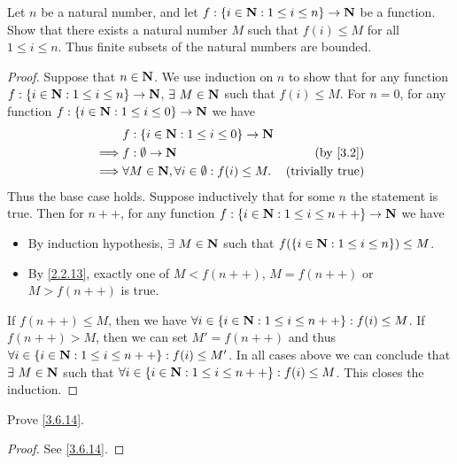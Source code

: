 \begin{exercise}\label{ex 3.6.3}
  Let \(n\) be a natural number, and let \(f : \{i \in \mathbf{N} : 1 \leq i \leq n\} \to \mathbf{N}\) be a function.
  Show that there exists a natural number \(M\) such that \(f(i) \leq M\) for all \(1 \leq i \leq n\).
  Thus finite subsets of the natural numbers are bounded.
\end{exercise}

\begin{proof}
  Suppose that \(n \in \mathbf{N}\).
  We use induction on \(n\) to show that for any function \(f : \{i \in \mathbf{N} : 1 \leq i \leq n\} \to \mathbf{N}\), \(\exists\ M \in \N\) such that \(f(i) \leq M\).
  For \(n = 0\), for any function \(f : \{i \in \mathbf{N} : 1 \leq i \leq 0\} \to \mathbf{N}\) we have
  \begin{align*}
             & f : \{i \in \N : 1 \leq i \leq 0\} \to \N                                          \\
    \implies & f : \emptyset \to \N                                     & \text{(by \cref{3.2})}  \\
    \implies & \forall M \in \N, \forall i \in \emptyset : f(i) \leq M. & \text{(trivially true)} \\
  \end{align*}
  Thus the base case holds.
  Suppose inductively that for some \(n\) the statement is true.
  Then for \(n++\), for any function \(f : \{i \in \mathbf{N} : 1 \leq i \leq n++\} \to \mathbf{N}\) we have
  \begin{itemize}
    \item By induction hypothesis, \(\exists\ M \in \N\) such that \(f(\{i \in \mathbf{N} : 1 \leq i \leq n\}) \leq M\).
    \item By \cref{2.2.13}, exactly one of \(M < f(n++)\), \(M = f(n++)\) or \(M > f(n++)\) is true.
  \end{itemize}
  If \(f(n++) \leq M\), then we have \(\forall i \in \{i \in \mathbf{N} : 1 \leq i \leq n++\} : f(i) \leq M\).
  If \(f(n++) > M\), then we can set \(M' = f(n++)\) and thus \(\forall i \in \{i \in \mathbf{N} : 1 \leq i \leq n++\} : f(i) \leq M'\).
  In all cases above we can conclude that \(\exists\ M \in \N\) such that \(\forall i \in \{i \in \mathbf{N} : 1 \leq i \leq n++\} : f(i) \leq M\).
  This closes the induction.
\end{proof}

\begin{exercise}\label{ex 3.6.4}
  Prove \cref{3.6.14}.
\end{exercise}

\begin{proof}
  See \cref{3.6.14}.
\end{proof}

